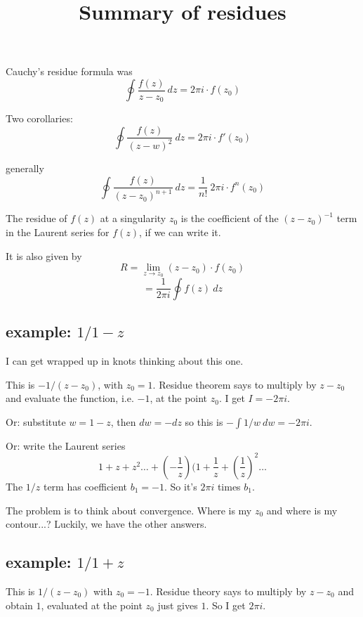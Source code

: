 \documentclass[11pt, oneside]{article}
\title{Summary of residues}
\date{}
\begin{document}
\maketitle
\Large


Cauchy's residue formula was
\[ \oint \frac{f(z)}{z - z_0} \ dz = 2 \pi i \cdot f(z_0) \]

Two corollaries:
\[ \oint \frac{f(z)}{(z - w)^2} \ dz = 2 \pi i \cdot f'(z_0) \]

generally
\[ \oint \frac{f(z)}{(z - z_0)^{n+1}} \ dz = \frac{1}{n!} \ 2 \pi i \cdot f^{n}(z_0) \]

The residue of $f(z)$ at a singularity $z_0$ is the coefficient of the $(z - z_0)^{-1}$ term in the Laurent series for $f(z)$, if we can write it.

It is also given by
\[ R = \lim_{z \rightarrow z_0} (z - z_0) \cdot f(z_0) \]
\[ = \frac{1}{2 \pi i} \oint f(z) \ dz \]

\subsection*{example:  $1/1-z$}

I can get wrapped up in knots thinking about this one.

This is $-1/(z-z_0)$, with $z_0 = 1$.  Residue theorem says to multiply by $z - z_0$ and evaluate the function, i.e. $-1$, at the point $z_0$.  I get $I = -2 \pi i$.

Or:  substitute $w = 1-z$, then $dw = -dz$ so this is $- \int 1/w \ dw = -2 \pi i$.  

Or:  write the Laurent series
\[ 1 + z + z^2 \dots + (-\frac{1}{z})(1 + \frac{1}{z} + ( \frac{1}{z})^2 \dots \]
The $1/z$ term has coefficient $b_1 = -1$.  So it's $2 \pi i$ times $b_1$.

The problem is to think about convergence.  Where is my $z_0$ and where is my contour...?  Luckily, we have the other answers.

\subsection*{example:  $1/1+z$}

This is $1/(z - z_0)$ with $z_0 = -1$.  Residue theory says to multiply by $z - z_0$ and obtain $1$, evaluated at the point $z_0$ just gives $1$.  So I  get $2 \pi i$.
\end{document}
